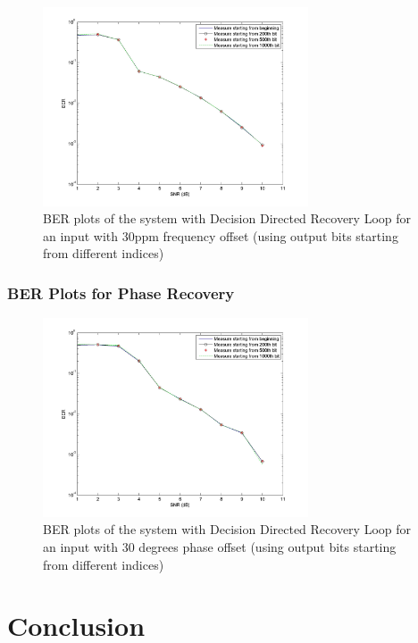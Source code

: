 \documentclass[]{article}
\begin{document}
\begin{figure}[H]
\centering
\hspace*{-2cm}\includegraphics[width=0.7\textwidth]{qpBERfo_ddr2.jpg}
\caption{BER plots of the system with Decision Directed Recovery Loop for an input with 30ppm frequency offset (using output bits starting from different indices)}
\end{figure}

\subsubsection{BER Plots for Phase Recovery}
\begin{figure}[H]
\centering
\hspace*{-2cm}\includegraphics[width=0.7\textwidth]{qpBERpo_ddr1.jpg}
\caption{BER plots of the system with Decision Directed Recovery Loop for an input with 30 degrees phase offset (using output bits starting from different indices)}
\end{figure}

\newpage
\section{Conclusion}
\label{sec:conc}
\end{document}
